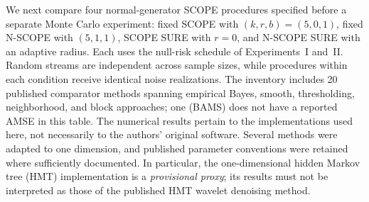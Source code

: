 \documentclass[12pt]{article}
\theoremstyle{definition}
\theoremstyle{definition}
\begin{document}
We next compare four normal-generator SCOPE procedures specified
before a separate Monte Carlo experiment: fixed SCOPE with
$(k,r,b)=(5,0,1)$, fixed N-SCOPE with $(5,1,1)$, SCOPE SURE
with $r=0$, and N-SCOPE SURE with an adaptive radius. Each uses
the null-risk schedule of Experiments~I and~II. Random streams
are independent across sample sizes, while procedures within each
condition receive identical noise realizations. The inventory
includes 20 published comparator methods spanning empirical Bayes,
smooth, thresholding, neighborhood, and block approaches; one
(BAMS) does not have a reported AMSE in this table. The numerical
results pertain to the implementations used here, not necessarily
to the authors' original software. Several methods were adapted
to one dimension, and published parameter conventions were retained
where sufficiently documented. In particular, the one-dimensional
hidden Markov tree (HMT) implementation is a \emph{provisional proxy};
its results must not be interpreted as those of the published HMT
wavelet denoising method.
\end{document}
